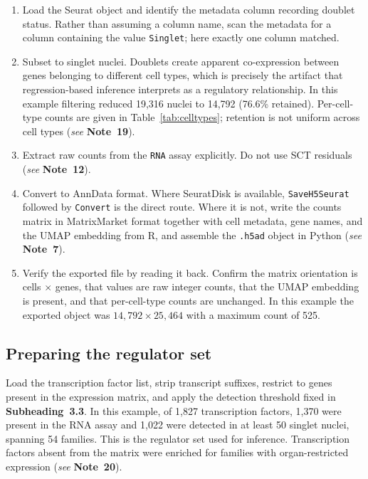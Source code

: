 \documentclass[11pt,a4paper]{article}
\newcommand{\seenote}[1]{(\textit{see} \textbf{Note~#1})}
\begin{document}
\begin{enumerate}[leftmargin=*]
\item Load the Seurat object and identify the metadata column recording doublet status. Rather than assuming a column name, scan the metadata for a column containing the value \texttt{Singlet}; here exactly one column matched.

\item Subset to singlet nuclei. Doublets create apparent co-expression between genes belonging to different cell types, which is precisely the artifact that regression-based inference interprets as a regulatory relationship. In this example filtering reduced 19,316 nuclei to 14,792 (76.6\% retained). Per-cell-type counts are given in Table~\ref{tab:celltypes}; retention is not uniform across cell types \seenote{19}.

\item Extract raw counts from the \texttt{RNA} assay explicitly. Do not use SCT residuals \seenote{12}.

\item Convert to AnnData format. Where SeuratDisk is available, \texttt{SaveH5Seurat} followed by \texttt{Convert} is the direct route. Where it is not, write the counts matrix in MatrixMarket format together with cell metadata, gene names, and the UMAP embedding from R, and assemble the \texttt{.h5ad} object in Python \seenote{7}.

\item Verify the exported file by reading it back. Confirm the matrix orientation is cells $\times$ genes, that values are raw integer counts, that the UMAP embedding is present, and that per-cell-type counts are unchanged. In this example the exported object was $14{,}792 \times 25{,}464$ with a maximum count of 525.
\end{enumerate}

\subsection{Preparing the regulator set}

Load the transcription factor list, strip transcript suffixes, restrict to genes present in the expression matrix, and apply the detection threshold fixed in \textbf{Subheading~3.3}. In this example, of 1,827 transcription factors, 1,370 were present in the RNA assay and 1,022 were detected in at least 50 singlet nuclei, spanning 54 families. This is the regulator set used for inference. Transcription factors absent from the matrix were enriched for families with organ-restricted expression \seenote{20}.
\end{document}
